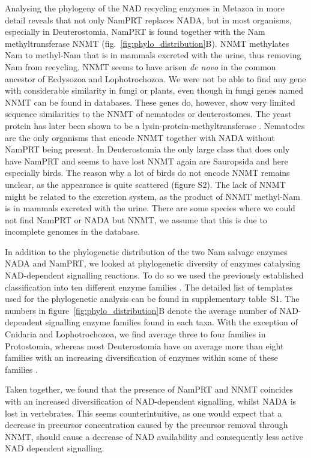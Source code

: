 Analysing the phylogeny of the NAD recycling enzymes in Metazoa in more detail reveals that not only NamPRT replaces NADA, but in most organisms, especially in Deuterostomia, NamPRT is found together with the Nam methyltransferase NNMT (fig.~\ref{fig:phylo_distribution}B). NNMT methylates Nam to methyl-Nam that is in mammals excreted with the urine, thus removing Nam from recycling. NNMT seems to have arisen \textit{de novo} in the common ancestor of Ecdysozoa and Lophotrochozoa. We were not be able to find any gene with considerable similarity in fungi or plants, even though in fungi genes named NNMT can be found in databases. These genes do, however, show very limited sequence similarities to the NNMT of nematodes or deuterostomes. The yeast protein has later been shown to be a lysin-protein-methyltransferase \cite{Wlodarski2011}. Nematodes are the only organisms that encode NNMT together with NADA without NamPRT being present. In Deuterostomia the only large class that does only have NamPRT and seems to have lost NNMT again are Sauropsida and here especially birds. The reason why a lot of birds do not encode NNMT remains unclear, as the appearance is quite scattered (figure S2). The lack of NNMT might be related to the excretion system, as the product of NNMT methyl-Nam is in mammals excreted with the urine. There are some species where we could not find NamPRT or NADA but NNMT, we assume that this is due to incomplete genomes in the database.

In addition to the phylogenetic distribution of the two Nam salvage enzymes NADA and NamPRT, we looked at phylogenetic diversity of enzymes catalysing NAD-dependent signalling reactions. To do so we used the previously established classification into ten different enzyme families \cite{Gossmann2012FEBS}. The detailed list of templates used for the phylogenetic analysis can be found in supplementary table~S1. The numbers in figure~\ref{fig:phylo_distribution}B denote the average number of NAD-dependent signalling enzyme families found in each taxa. With the exception of Cnidaria and Lophotrochozoa, we find average three to four families in Protostomia, whereas most Deuterostomia have on average more than eight families with an increasing diversification of enzymes within some of these families \cite{Gossmann2014DNAR}.

Taken together, we found that the presence of NamPRT and NNMT coincides with an increased diversification of NAD-dependent signalling, whilst NADA is lost in vertebrates. This seems counterintuitive, as one would expect that a decrease in precursor concentration caused by the precursor removal through NNMT, should cause a decrease of NAD availability and consequently less active NAD dependent signalling.


